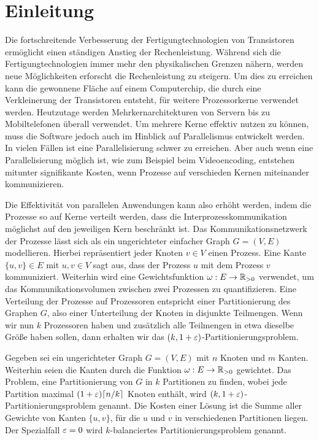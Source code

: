 
\chapter{Einleitung}\label{chapter:introduction}
Die fortschreitende Verbesserung der Fertigungtechnologien von Transistoren ermöglicht einen ständigen Anstieg der Rechenleistung.
Während sich die Fertigungtechnologien immer mehr den physikalischen Grenzen nähern, werden neue Möglichkeiten erforscht die Rechenleistung zu steigern.
Um dies zu erreichen kann die gewonnene Fläche auf einem Computerchip, die durch eine Verkleinerung der Transistoren entsteht, für weitere Prozessorkerne verwendet werden.
Heutzutage werden Mehrkernarchitekturen von Servern bis zu Mobiltelefonen überall verwendet.
Um mehrere Kerne effektiv nutzen zu können, muss die Software jedoch auch im Hinblick auf Parallelismus entwickelt werden.
In vielen Fällen ist eine Parallelisierung schwer zu erreichen.
Aber auch wenn eine Parallelisierung möglich ist, wie zum Beispiel beim Videoencoding, entstehen mitunter signifikante Kosten, wenn Prozesse auf verschieden Kernen miteinander kommunizieren.~\cite{LTS09}

Die Effektivität von parallelen Anwendungen kann also erhöht werden, indem die Prozesse so auf Kerne verteilt werden, dass die Interprozesskommunikation möglichst auf den jeweiligen Kern beschränkt ist.
Das Kommunikationsnetzwerk der Prozesse lässt sich als ein ungerichteter einfacher Graph $G = (V, E)$ modellieren.
Hierbei repräsentiert jeder Knoten $v \in V$ einen Prozess.
Eine Kante $\{u, v\} \in E$ mit $u, v \in V$ sagt aus, dass der Prozess $u$ mit dem Prozess $v$ kommuniziert.
Weiterhin wird eine Gewichtsfunktion $\omega : E \rightarrow \mathbb{R}_{>0}$ verwendet, um das Kommunikationsvolumen zwischen zwei Prozessen zu quantifizieren.
Eine Verteilung der Prozesse auf Prozessoren entspricht einer Partitionierung des Graphen $G$, also einer Unterteilung der Knoten in disjunkte Teilmengen.
Wenn wir nun $k$ Prozessoren haben und zusätzlich alle Teilmengen in etwa dieselbe Größe haben sollen, dann erhalten wir das $(k, 1 + \varepsilon)$\hyp Partitionierungsproblem.

\begin{defn}
    Gegeben sei ein ungerichteter Graph $G = (V, E)$ mit $n$ Knoten und $m$ Kanten.
    Weiterhin seien die Kanten durch die Funktion $\omega : E \rightarrow \mathbb{R}_{> 0}$ gewichtet.
    Das Problem, eine Partitionierung von $G$ in $k$ Partitionen zu finden, wobei jede Partition maximal $(1 + \varepsilon) \lceil n/k\rceil$ Knoten enthält, wird $(k,1 + \varepsilon)$\hyp Partitionierungsproblem genannt.
    Die Kosten einer Lösung ist die Summe aller Gewichte von Kanten $\{u, v\}$, für die $u$ und $v$ in verschiedenen Partitionen liegen.
    Der Spezialfall $\varepsilon=0$ wird $k$\hyp balanciertes Partitionierungsproblem genannt.
\end{defn}

